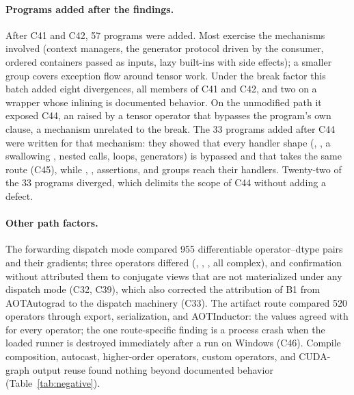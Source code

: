 \paragraph{Programs added after the findings.} After C41 and C42, 57 programs were added. Most exercise the
mechanisms involved (context managers, the generator protocol driven by the consumer, ordered containers passed as
inputs, lazy built-ins with side effects); a smaller group covers exception flow around tensor work. Under the
break factor this batch added eight divergences, all members of C41 and C42, and two on a
 wrapper whose inlining is documented behavior. On the unmodified path it exposed
C44, an  raised by a tensor operator that bypasses the program's own  clause, a
mechanism unrelated to the break. The 33 programs added after C44 were written for that mechanism: they showed
that every handler shape (, , a swallowing
, nested calls, loops, generators) is bypassed and that  takes the
same route (C45), while , , assertions, and  groups reach
their handlers. Twenty-two of the 33 programs diverged, which delimits the scope of C44 without adding a defect.

\paragraph{Other path factors.} The forwarding dispatch mode compared 955 differentiable operator--dtype pairs
and their gradients; three operators differed (, , ,
all complex), and confirmation without \tcompile attributed them to conjugate views that are not materialized
under any dispatch mode (C32, C39), which also corrected the attribution of B1 from AOTAutograd to the dispatch
machinery (C33). The artifact route compared 520 operators through export, serialization, and AOTInductor: the
values agreed with \tcompile for every operator; the one route-specific finding is a process crash when the
loaded runner is destroyed immediately after a run on Windows (C46). Compile composition, autocast, higher-order operators, custom operators, and CUDA-graph output reuse found
nothing beyond documented behavior (Table~\ref{tab:negative}).


